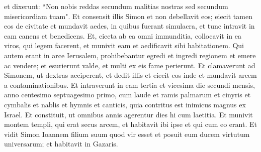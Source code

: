 \begin{biblechapter}
\verse et dixerunt: “Non nobis reddas secundum malitias nostras sed secundum misericordiam tuam". 
\verse Et consensit illis Simon et non debellavit eos; eiecit tamen eos de civitate et mundavit aedes, in quibus fuerant simulacra, et tunc intravit in eam canens et benedicens. 
\verse Et, eiecta ab ea omni immunditia, collocavit in ea viros, qui legem facerent, et munivit eam et aedificavit sibi habitationem. 
\verse Qui autem erant in arce Ierusalem, prohibebantur egredi et ingredi regionem et emere ac vendere; et esurierunt valde, et multi ex eis fame perierunt. 
\verse Et clamaverunt ad Simonem, ut dextras acciperent, et dedit illis et eiecit eos inde et mundavit arcem a contaminationibus. 
\verse Et intraverunt in eam tertia et vicesima die secundi mensis, anno centesimo septuagesimo primo, cum laude et ramis palmarum et cinyris et cymbalis et nablis et hymnis et canticis, quia contritus est inimicus magnus ex Israel. 
\verse Et constituit, ut omnibus annis agerentur dies hi cum laetitia. 
\verse Et munivit montem templi, qui erat secus arcem, et habitavit ibi ipse et qui cum eo erant. 
\verse Et vidit Simon Ioannem filium suum quod vir esset et posuit eum ducem virtutum universarum; et habitavit in Gazaris. 
\end{biblechapter}

